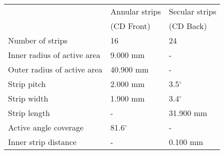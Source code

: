 \begin{tabular}{lll}
\hline
                            & Annular strips & Secular strips \\
                            & (CD Front)     & (CD Back)      \\
\hline
Number of strips            & 16             & 24             \\
Inner radius of active area &  9.000 mm      & -              \\
Outer radius of active area & 40.900 mm      & -              \\
Strip pitch                 &  2.000 mm      & 3.5$^\circ$    \\
Strip width                 &  1.900 mm      & 3.4$^\circ$    \\
Strip length                &  -             & 31.900 mm      \\
Active angle coverage       & 81.6$^\circ$   & -              \\
Inner strip distance        &  -             & 0.100 mm       \\
\hline
\end{tabular}